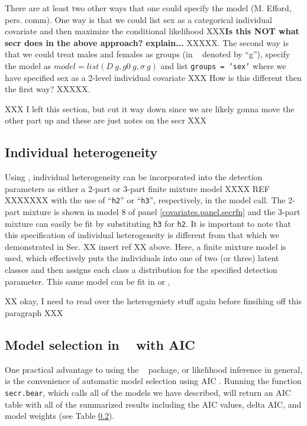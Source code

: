 There are at least two other ways that one could
specify the model (M. Efford, pers. comm).  One way is that we could
list sex as a categorical individual covariate and then maximize the
conditional likelihood XXX{\bf Is this NOT what secr does in the above
  approach? explain...} XXXXX.  The second way is that we could treat males and females as groups (in \secr~ denoted by ``g''), specify the
model as $model = list(D~g, g0~g, \sigma~g)$ and list \mbox{\tt groups = 'sex'}
where we have specified sex as a 2-level individual covariate XXX How
is this different then the first way? XXXXX.  


XXX I left this section, but cut it way down since we are likely gonna move the other part up and 
these are just notes on the secr XXX

\subsection{Individual heterogeneity}

Using \secr,  individual heterogeneity can be incorporated
into the detection parameters as either a 2-part or 3-part finite
mixture model XXXX REF XXXXXXX with the use of ``\mbox{\tt h2}'' or
``\mbox{\tt h3}'', respectively, in the
model call.   The 2-part mixture is shown in model 8 of panel
\ref{covariates.panel.secrfn} and the 3-part mixture can easily be fit by
substituting \mbox{\tt h3} for \mbox{\tt h2}.  
It is important to note that this specification of
individual heterogeneity is different from that which we demonstrated in Sec. 
XX insert ref XX above.  Here, a finite mixture model is used, which effectively
puts the individuals into one of two (or three) latent classes and
then assigns each class a distribution for the specified detection
parameter.   This same model can be fit in \jags or \bugs, 

XX okay, I need to read over the heterogeniety stuff again before finsihing off this 
paragraph XXX


\subsection{Model selection in \secr~ with AIC}

One practical advantage to using the \secr~ package, or likelihood
inference in general, is the convenience of automatic model selection
using AIC \citep{burnham_anderson:1998}.
Running the function {\tt secr.bear}, which calls all of the models we
have described, will return
an AIC table with all of the summarized results including the AIC values,
delta AIC, and model weights (see Table \ref{}). 

